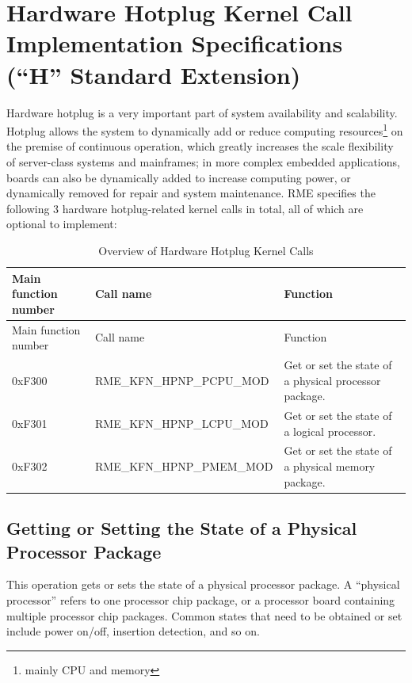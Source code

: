 \section{Hardware Hotplug Kernel Call Implementation Specifications (``H'' Standard Extension)}\label{sec:8-hardware-hotplug-kernel-calls}
\nopagebreak[4]

Hardware hotplug is a very important part of system availability and scalability. Hotplug allows the system to dynamically add or reduce computing resources\footnote{mainly CPU and memory} on the premise of continuous operation, which greatly increases the scale flexibility of server-class systems and mainframes; in more complex embedded applications, boards can also be dynamically added to increase computing power, or dynamically removed for repair and system maintenance. RME specifies the following 3 hardware hotplug-related kernel calls in total, all of which are optional to implement:

\begin{xltabular}{\textwidth}{@{}>{\hsize\raggedright\arraybackslash}X>{\hsize\raggedright\arraybackslash}X>{\hsize\raggedright\arraybackslash}X@{}}
\caption{Overview of Hardware Hotplug Kernel Calls}\label{tab:8-35-hardware-hotplug-kernel-calls}\\
\toprule
Main function number & Call name & Function\tabularnewline
\endfirsthead
\toprule
Main function number & Call name & Function\tabularnewline
\midrule
\endhead
\bottomrule
\endlastfoot
0xF300 & RME\_KFN\_HPNP\_PCPU\_MOD &
Get or set the state of a physical processor package.\tabularnewline
0xF301 & RME\_KFN\_HPNP\_LCPU\_MOD &
Get or set the state of a logical processor.\tabularnewline
0xF302 & RME\_KFN\_HPNP\_PMEM\_MOD &
Get or set the state of a physical memory package.\tabularnewline
\end{xltabular}
\nopagebreak[4]

\subsection{Getting or Setting the State of a Physical Processor Package}\label{subsec:8-get-or-set-physical-processor-package-state}

This operation gets or sets the state of a physical processor package. A ``physical processor'' refers to one processor chip package, or a processor board containing multiple processor chip packages. Common states that need to be obtained or set include power on/off, insertion detection, and so on.

